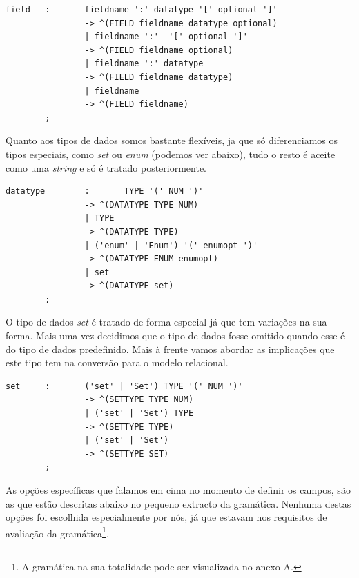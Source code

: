 \documentclass[a4paper]{article}
\begin{document}
\begin{small}
\begin{lstlisting}
field   :       fieldname ':' datatype '[' optional ']'
                -> ^(FIELD fieldname datatype optional)
                | fieldname ':'  '[' optional ']'
                -> ^(FIELD fieldname optional)
                | fieldname ':' datatype
                -> ^(FIELD fieldname datatype)
                | fieldname
                -> ^(FIELD fieldname)
        ;
\end{lstlisting}
\end{small}

\hspace{1cm}Quanto aos tipos de dados somos bastante flexíveis, ja que só diferenciamos os tipos especiais, como {\em set} ou {\em enum} (podemos ver abaixo), tudo o resto é aceite como uma {\em string} e só é tratado posteriormente.\\

\begin{small}
\begin{lstlisting}
datatype        :       TYPE '(' NUM ')'
                -> ^(DATATYPE TYPE NUM)
                | TYPE
                -> ^(DATATYPE TYPE)
                | ('enum' | 'Enum') '(' enumopt ')'
                -> ^(DATATYPE ENUM enumopt)
                | set
                -> ^(DATATYPE set)
        ;
\end{lstlisting}
\end{small}

\hspace{1cm}O tipo de dados {\em set} é tratado de forma especial já que tem variações na sua forma. Mais uma vez decidimos que o tipo de dados fosse omitido quando esse é do tipo de dados predefinido. Mais à frente vamos abordar as implicações que este tipo tem na conversão para o modelo relacional.\\

\begin{small}
\begin{lstlisting}
set     :       ('set' | 'Set') TYPE '(' NUM ')'
                -> ^(SETTYPE TYPE NUM)
                | ('set' | 'Set') TYPE
                -> ^(SETTYPE TYPE)
                | ('set' | 'Set')
                -> ^(SETTYPE SET)
        ;
\end{lstlisting}
\end{small}

\hspace{1cm}As opções específicas que falamos em cima no momento de definir os campos, são as que estão descritas abaixo no pequeno extracto da gramática. Nenhuma destas opções foi escolhida especialmente por nós, já que estavam nos requisitos de avaliação da gramática\footnote{A gramática na sua totalidade pode ser visualizada no anexo A.}.\\
\end{document}
